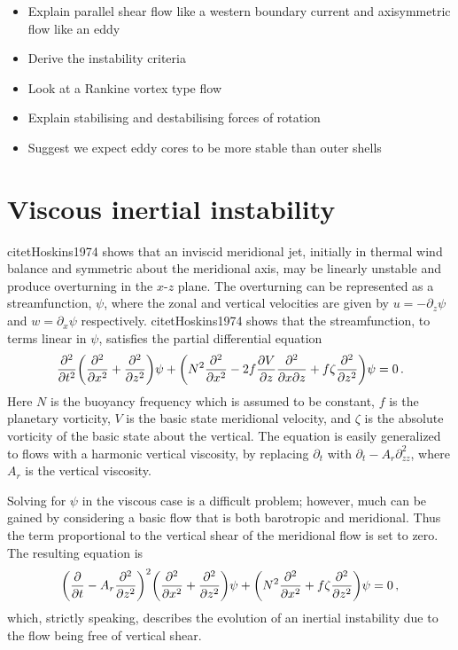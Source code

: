 

\begin{itemize}
    \item Explain parallel shear flow like a western boundary current and axisymmetric flow like an eddy
    \item Derive the instability criteria
    \item Look at a Rankine vortex type flow
    \item Explain stabilising and destabilising forces of rotation
    \item Suggest we expect eddy cores to be more stable than outer shells
\end{itemize}



\section{Viscous inertial instability}
citet{Hoskins1974} shows that an inviscid meridional jet, initially in thermal wind balance and symmetric about the meridional axis, may be linearly unstable and produce overturning in the $x$-$z$ plane. The overturning can be represented as a streamfunction, $\psi$, where the zonal and vertical velocities are given by $u = - \partial_z \psi$ and $w = \partial_x \psi$ respectively. citet{Hoskins1974} shows that the streamfunction, to terms linear in $\psi$, satisfies the partial differential equation
\begin{equation}
    \pdv[2]{}{t} \bigg(\pdv[2]{}{x} + \pdv[2]{}{z}\bigg) \psi + \bigg( N^2 \pdv[2]{}{x} - 2 f \pdv{V}{z} \pdv[2]{}{x}{z} + f \zeta \pdv[2]{}{z} \bigg) \psi = 0 \, .
\end{equation}
Here $N$ is the buoyancy frequency which is assumed to be constant, $f$ is the planetary vorticity, $V$ is the basic state meridional velocity, and $\zeta$ is the absolute vorticity of the basic state about the vertical.
The equation is easily generalized to flows with a harmonic vertical viscosity, by replacing $\partial_t$ with $\partial_t - A_r \partial^2_{zz}$, where $A_r$ is the vertical viscosity. 

Solving for $\psi$ in the viscous case is a difficult problem; however, much can be gained by considering a basic flow that is both barotropic and meridional. Thus the term proportional to the vertical shear of the meridional flow is set to zero. The resulting equation is
\begin{equation}
    \label{eq:BarotropicHoskins}
    \bigg(\pdv{}{t} - A_r \pdv[2]{}{z} \bigg)^2 \bigg(\pdv[2]{}{x} + \pdv[2]{}{z}\bigg) \psi + \bigg( N^2 \pdv[2]{}{x} + f \zeta \pdv[2]{}{z} \bigg) \psi = 0 \, ,  
\end{equation}
which, strictly speaking, describes the evolution of an inertial instability due to the flow being free of vertical shear.

